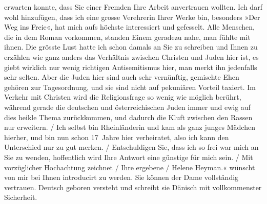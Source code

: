 \begin{ledgroupsized}[t]{13cm}
{{{                        erwarten konnte, dass Sie einer Fremden Ihre Arbeit anvertrauen wollten.
                        {\pb}Ich darf wohl hinzufügen, dass ich eine grosse Verehrerin Ihrer Werke
                        bin, besonders »Der Weg ins Freie«, hat
                        mich aufs höchste interessiert und gefesselt. Alle Menschen, die in dem
                        Roman vorkommen, standen Einem geradezu nahe, man fühlte mit ihnen. Die
                        grösste Lust hatte ich schon damals an Sie zu schreiben und Ihnen zu
                        erzählen wie ganz anders das Verhältnis zwischen Christen und Juden hier
                        ist, es giebt wirklich nur wenig richtigen Antisemitismus hier, man merkt
                        ihn jedenfalls sehr selten. Aber die Juden hier sind auch sehr
                        ver{\pb}nünftig, gemischte Ehen gehören zur Tagesordnung, und sie sind nicht
                        auf pekuniären Vorteil taxiert. Im Verkehr mit Christen wird die
                        Religionsfrage so wenig wie möglich berührt, während gerade die deutschen und österreichischen Juden immer und ewig auf dies heikle Thema
                        zurückkommen, und dadurch die Kluft zwischen den Rassen nur erweitern.{ / }Ich selbst bin Rheinländerin und kam als ganz junges Mädchen hierher, und bin nun
                        schon 17 Jahre hier verheiratet, also ich kann den Unterschied nur {\pb}zu
                        gut merken.{ / }Entschuldigen Sie, dass ich so frei war mich an Sie zu wenden, hoffentlich
                        wird Ihre Antwort eine günstige für mich sein.{ / }Mit vorzüglicher Hochachtung zeichnet{ / }Ihre ergebene{ / }Helene Heyman.«}}}\label{K_L02049_1h} wünscht von mir bei Ihnen introducirt zu werden. Sie können der
               Dame vollständig vertrauen. Deutsch geboren versteht und schreibt sie Dänisch mit vollkommenster Sicherheit.\pend
                     \endnumbering{}\end{ledgroupsized}  \newcommand{\dateiname}{L02049}\newcommand{\titel}{Georg Brandes an Arthur Schnitzler, vor dem 2. 12. 1911}\newcommand{\editorInnen}{Martin Anton Müller und Gerd-Hermann Susen}
            \footnotesize
\begin{ledgroupsized}[t]{11.5cm}
\end{ledgroupsized}
         
      